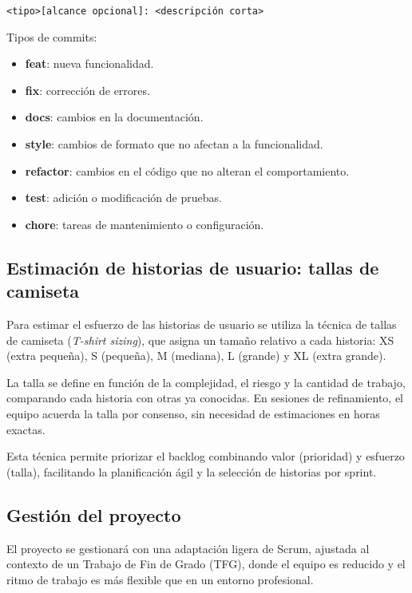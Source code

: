 \begin{center}
\texttt{<tipo>[alcance opcional]: <descripción corta>}
\end{center}

Tipos de commits:

\begin{itemize}
    \item \textbf{feat}: nueva funcionalidad.
    \item \textbf{fix}: corrección de errores.
    \item \textbf{docs}: cambios en la documentación.
    \item \textbf{style}: cambios de formato que no afectan a la funcionalidad.
    \item \textbf{refactor}: cambios en el código que no alteran el comportamiento.
    \item \textbf{test}: adición o modificación de pruebas.
    \item \textbf{chore}: tareas de mantenimiento o configuración.
\end{itemize}

\subsection{Estimación de historias de usuario: tallas de camiseta}
Para estimar el esfuerzo de las historias de usuario se utiliza la técnica de tallas de camiseta (\textit{T-shirt sizing}), que asigna un tamaño relativo a cada historia: XS (extra pequeña), S (pequeña), M (mediana), L (grande) y XL (extra grande).

La talla se define en función de la complejidad, el riesgo y la cantidad de trabajo, comparando cada historia con otras ya conocidas. En sesiones de refinamiento, el equipo acuerda la talla por consenso, sin necesidad de estimaciones en horas exactas.

Esta técnica permite priorizar el backlog combinando valor (prioridad) y esfuerzo (talla), facilitando la planificación ágil y la selección de historias por sprint.

\subsection{Gestión del proyecto}
El proyecto se gestionará con una adaptación ligera de Scrum, ajustada al contexto de un Trabajo de Fin de Grado (TFG), donde el equipo es reducido y el ritmo de trabajo es más flexible que en un entorno profesional.

